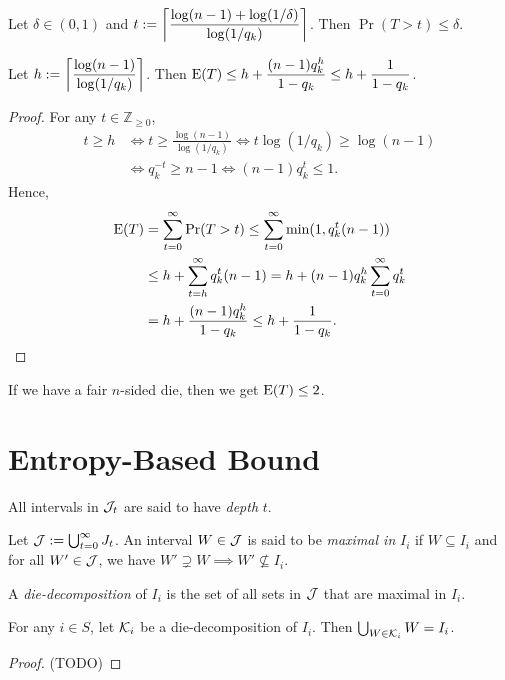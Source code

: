 \documentclass[a4paper, 12pt, fleqn]{article}
\begin{document}
\begin{corollary}
Let $\delta \in (0, 1)$ and
$\displaystyle t := \left\lceil \frac{\log(n-1) + \log(1/\delta)}{\log(1/q_k)} \right\rceil$.
Then $\Pr(T > t) \le \delta$.
\end{corollary}

\begin{theorem}
Let $\displaystyle h := \left\lceil \frac{\log(n-1)}{\log(1/q_k)} \right\rceil$. Then
$\displaystyle \operatorname*{E}(T) \le h + \frac{(n-1)q_k^h}{1 - q_k} \le h + \frac{1}{1 - q_k}$.
\end{theorem}
\begin{proof}
For any $t \in \mathbb{Z}_{\ge 0}$,
\begin{align*}
t \ge h
&\iff t \ge \frac{\log(n-1)}{\log(1/q_k)}
\iff t\log(1/q_k) \ge \log(n-1)
\\ &\iff q_k^{-t} \ge n-1
\iff (n-1)q_k^t \le 1.
\end{align*}
Hence,
\begin{align*}
\operatorname*{E}(T) &= \sum_{t=0}^{\infty} \Pr(T > t)
\le \sum_{t=0}^{\infty} \min(1, q_k^t(n-1))
\\ &\le h + \sum_{t=h}^{\infty} q_k^t(n-1)
= h + (n-1)q_k^h \sum_{t=0}^{\infty} q_k^t
\\ &= h + \frac{(n-1)q_k^h}{1 - q_k}
\le h + \frac{1}{1 - q_k}.
\qedhere \end{align*}
\end{proof}

If we have a fair $n$-sided die, then we get $\operatorname*{E}(T) \le 2$.

\section{Entropy-Based Bound}

All intervals in $\mathcal{J}_t$ are said to have \emph{depth} $t$.

\begin{definition}
Let $\mathcal{J} := \bigcup_{t=0}^{\infty} J_t$. An interval $W \in \mathcal{J}$ is said to be
\emph{maximal in} $I_i$ if $W \subseteq I_i$ and for all $W' \in \mathcal{J}$,
we have $W' \supsetneq W \implies W' \nsubseteq I_i$.

A \emph{die-decomposition} of $I_i$ is the set of all sets in $\mathcal{J}$ that are maximal in $I_i$.
\end{definition}

\begin{lemma}
For any $i \in S$, let $\mathcal{K}_i$ be a die-decomposition of $I_i$.
Then $\bigcup_{W \in \mathcal{K}_i} W = I_i$.
\end{lemma}
\begin{proof}
(TODO)
\end{proof}
\end{document}
